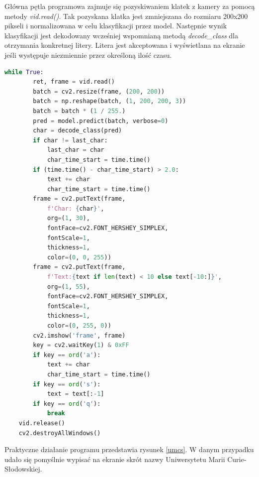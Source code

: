 \documentclass[a4paper,12pt,oneside]{book} %
\begin{document}
Główna pętla programowa zajmuje się pozyskiwaniem klatek z kamery za pomocą metody \emph{vid.read()}. Tak pozyskana klatka jest zmniejszana do rozmiaru 200x200 pikseli i normalizowana w celu klasyfikacji przez model. Następnie wynik klasyfikacji jest dekodowany wcześniej wspomnianą metodą \emph{decode\_class} dla otrzymania konkretnej litery. Litera jest akceptowana i wyświetlana na ekranie jeśli występuje niezmiennie przez określoną ilość czasu.

\begin{lstlisting}[language=Python, caption={Pętla programowa}, label={lst:apploop}]
	while True:
		ret, frame = vid.read()
		batch = cv2.resize(frame, (200, 200))
		batch = np.reshape(batch, (1, 200, 200, 3))
		batch = batch * (1 / 255.)
		pred = model.predict(batch, verbose=0)
		char = decode_class(pred)
		if char != last_char:
			last_char = char
			char_time_start = time.time()
		if (time.time() - char_time_start) > 2.0:
			text += char
			char_time_start = time.time()
		frame = cv2.putText(frame,
			f'Char: {char}',
			org=(1, 30),
			fontFace=cv2.FONT_HERSHEY_SIMPLEX,
			fontScale=1,
			thickness=1,
			color=(0, 0, 255))
		frame = cv2.putText(frame,
			f'Text:{text if len(text) < 10 else text[-10:]}',
			org=(1, 55),
			fontFace=cv2.FONT_HERSHEY_SIMPLEX,
			fontScale=1,
			thickness=1,
			color=(0, 255, 0))
		cv2.imshow('frame', frame)
		key = cv2.waitKey(1) & 0xFF
		if key == ord('a'):
			text += char
			char_time_start = time.time()
		if key == ord('s'):
			text = text[:-1]
		if key == ord('q'):
			break
	vid.release()
	cv2.destroyAllWindows()
\end{lstlisting}

Praktyczne działanie programu przedstawia rysunek \ref{umcs}. W danym przypadku udało się pomyślnie wypisać na ekranie skrót nazwy Uniwersytetu Marii Curie-Słodowskiej.
\end{document}
